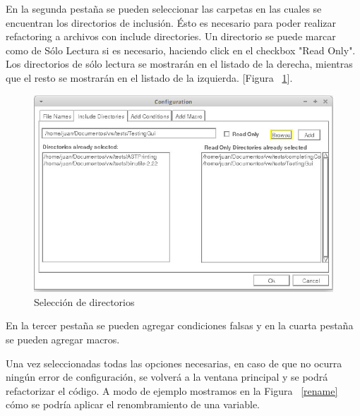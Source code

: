 \documentclass[a4paper,oneside,12pt]{article}
\begin{document}
En la segunda pestaña se pueden seleccionar las carpetas en las cuales se encuentran los directorios de inclusión. Ésto es necesario para poder realizar refactoring a archivos con include directories. Un directorio se puede marcar como de Sólo Lectura si es necesario, haciendo click en el checkbox "Read Only". Los directorios de sólo lectura se mostrarán en el listado de la derecha, mientras que el resto se mostrarán en el listado de la izquierda. [Figura ~\ref{include_directories}].

\begin{figure}[h!]
  \centering
    \includegraphics[scale=0.50]{images/uso/include_directories.jpg}
     \caption{Selecci\'on de directorios}
     \label{include_directories}
\end{figure}

En la tercer pestaña se pueden agregar condiciones falsas y en la cuarta pestaña se pueden agregar macros.

Una vez seleccionadas todas las opciones necesarias, en caso de que no ocurra ningún error de configuraci\'on, se volver\'a a la ventana principal y se podrá refactorizar el c\'odigo. A modo de ejemplo mostramos en la Figura ~\ref{rename} c\'omo se podr\'ia aplicar el renombramiento de una variable.
\end{document}
